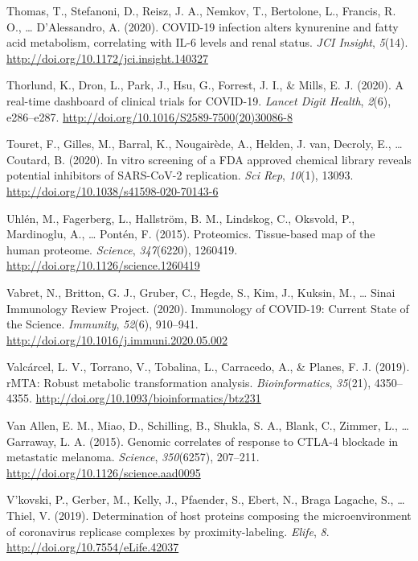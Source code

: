 \documentclass[12pt,twoside,openany,\mydriver]{thesis}  %
\begin{document}
\leavevmode\hypertarget{ref-thomas_covid-19_2020}{}%
Thomas, T., Stefanoni, D., Reisz, J. A., Nemkov, T., Bertolone, L., Francis, R. O., \ldots{} D'Alessandro, A. (2020). COVID-19 infection alters kynurenine and fatty acid metabolism, correlating with IL-6 levels and renal status. \emph{JCI Insight}, \emph{5}(14). \url{http://doi.org/10.1172/jci.insight.140327}

\leavevmode\hypertarget{ref-thorlund_real-time_2020}{}%
Thorlund, K., Dron, L., Park, J., Hsu, G., Forrest, J. I., \& Mills, E. J. (2020). A real-time dashboard of clinical trials for COVID-19. \emph{Lancet Digit Health}, \emph{2}(6), e286--e287. \url{http://doi.org/10.1016/S2589-7500(20)30086-8}

\leavevmode\hypertarget{ref-touret_vitro_2020}{}%
Touret, F., Gilles, M., Barral, K., Nougairède, A., Helden, J. van, Decroly, E., \ldots{} Coutard, B. (2020). In vitro screening of a FDA approved chemical library reveals potential inhibitors of SARS-CoV-2 replication. \emph{Sci Rep}, \emph{10}(1), 13093. \url{http://doi.org/10.1038/s41598-020-70143-6}

\leavevmode\hypertarget{ref-uhlen_proteomics_2015}{}%
Uhlén, M., Fagerberg, L., Hallström, B. M., Lindskog, C., Oksvold, P., Mardinoglu, A., \ldots{} Pontén, F. (2015). Proteomics. Tissue-based map of the human proteome. \emph{Science}, \emph{347}(6220), 1260419. \url{http://doi.org/10.1126/science.1260419}

\leavevmode\hypertarget{ref-vabret_immunology_2020}{}%
Vabret, N., Britton, G. J., Gruber, C., Hegde, S., Kim, J., Kuksin, M., \ldots{} Sinai Immunology Review Project. (2020). Immunology of COVID-19: Current State of the Science. \emph{Immunity}, \emph{52}(6), 910--941. \url{http://doi.org/10.1016/j.immuni.2020.05.002}

\leavevmode\hypertarget{ref-valcarcel_rmta_2019}{}%
Valcárcel, L. V., Torrano, V., Tobalina, L., Carracedo, A., \& Planes, F. J. (2019). rMTA: Robust metabolic transformation analysis. \emph{Bioinformatics}, \emph{35}(21), 4350--4355. \url{http://doi.org/10.1093/bioinformatics/btz231}

\leavevmode\hypertarget{ref-van_allen_genomic_2015}{}%
Van Allen, E. M., Miao, D., Schilling, B., Shukla, S. A., Blank, C., Zimmer, L., \ldots{} Garraway, L. A. (2015). Genomic correlates of response to CTLA-4 blockade in metastatic melanoma. \emph{Science}, \emph{350}(6257), 207--211. \url{http://doi.org/10.1126/science.aad0095}

\leavevmode\hypertarget{ref-vkovski_determination_2019}{}%
V'kovski, P., Gerber, M., Kelly, J., Pfaender, S., Ebert, N., Braga Lagache, S., \ldots{} Thiel, V. (2019). Determination of host proteins composing the microenvironment of coronavirus replicase complexes by proximity-labeling. \emph{Elife}, \emph{8}. \url{http://doi.org/10.7554/eLife.42037}
\end{document}
